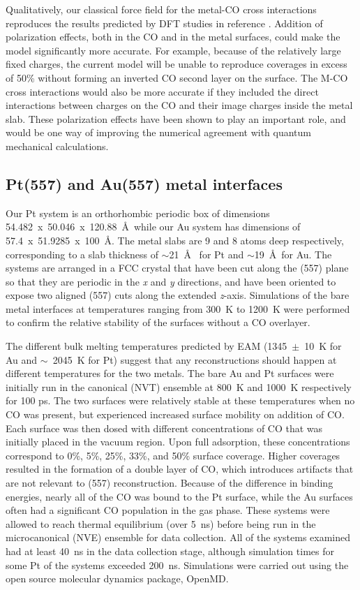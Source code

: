 \documentclass[journal = jpccck, manuscript = article]{achemso}
\begin{document}
Qualitatively, our classical force field for the metal-CO cross
interactions reproduces the results predicted by DFT studies in
reference { \protect\cite{Tao:2010}}. Addition
of polarization effects, both in the CO and in the metal surfaces,
could make the model significantly more accurate.  For example,
because of the relatively large fixed charges, the current model will
be unable to reproduce coverages in excess of 50\% without forming an
inverted CO second layer on the surface.  The M-CO cross interactions
would also be more accurate if they included the direct interactions
between charges on the CO and their image charges inside the metal
slab. These polarization effects have been shown to play an important
role,\cite{Deshlahra:2012} and would be one way of improving the
numerical agreement with quantum mechanical calculations.

\subsection{Pt(557) and Au(557) metal interfaces}
Our Pt system is an orthorhombic periodic box of dimensions
54.482~x~50.046~x~120.88~\AA~while our Au system has 
dimensions of 57.4~x~51.9285~x~100~\AA. The metal slabs 
are 9 and 8 atoms deep respectively, corresponding to a slab 
thickness of $\sim$21~\AA~ for Pt and $\sim$19~\AA~for Au.
The systems are arranged in a FCC crystal that have been cut
along the (557) plane so that they are periodic in the {\it x} and
{\it y} directions, and have been oriented to expose two aligned
(557) cuts along the extended {\it z}-axis.  Simulations of the 
bare metal interfaces at temperatures ranging from 300~K to
1200~K were performed to confirm the relative
stability of the surfaces without a CO overlayer.  

The different bulk melting temperatures predicted by EAM
(1345~$\pm$~10~K for Au\cite{Au:melting} and $\sim$~2045~K for
Pt\cite{Pt:melting}) suggest that any reconstructions should happen at
different temperatures for the two metals.  The bare Au and Pt
surfaces were initially run in the canonical (NVT) ensemble at 800~K
and 1000~K respectively for 100 ps. The two surfaces were relatively
stable at these temperatures when no CO was present, but experienced
increased surface mobility on addition of CO. Each surface was then
dosed with different concentrations of CO that was initially placed in
the vacuum region.  Upon full adsorption, these concentrations
correspond to 0\%, 5\%, 25\%, 33\%, and 50\% surface coverage. Higher
coverages resulted in the formation of a double layer of CO, which
introduces artifacts that are not relevant to (557) reconstruction.
Because of the difference in binding energies, nearly all of the CO
was bound to the Pt surface, while the Au surfaces often had a
significant CO population in the gas phase.  These systems were
allowed to reach thermal equilibrium (over 5~ns) before being run in
the microcanonical (NVE) ensemble for data collection. All of the
systems examined had at least 40~ns in the data collection stage,
although simulation times for some Pt of the systems exceeded 200~ns.
Simulations were carried out using the open source molecular dynamics
package, OpenMD.\cite{Ewald,OOPSE,openmd}
\end{document}
